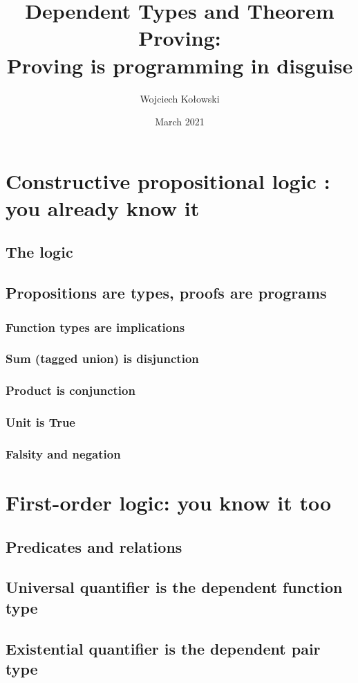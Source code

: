 \documentclass{beamer}
\title{Dependent Types and Theorem Proving: \\Proving is programming in disguise}
\author{Wojciech Kołowski}
\date{March 2021}
\begin{document}
\frame{\titlepage}
\frame{\tableofcontents}

\section{Constructive propositional logic : you already know it}
\subsection{The logic}
\subsection{Propositions are types, proofs are programs}
\subsubsection{Function types are implications}
\subsubsection{Sum (tagged union) is disjunction}
\subsubsection{Product is conjunction}
\subsubsection{Unit is True}
\subsubsection{Falsity and negation}

\section{First-order logic: you know it too}
\subsection{Predicates and relations}
\subsection{Universal quantifier is the dependent function type}
\subsection{Existential quantifier is the dependent pair type}
\end{document}
